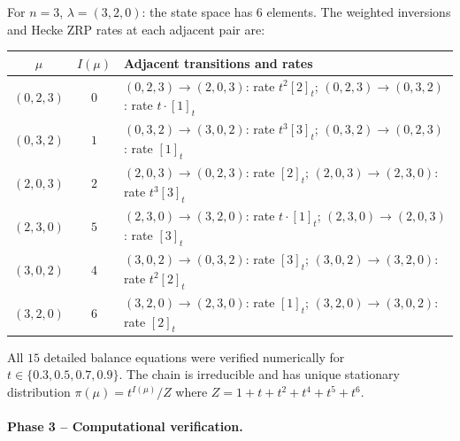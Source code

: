 \begin{remark}
\label{rem:p3-small}
For $n = 3$, $\lambda = (3,2,0)$: the state space has $6$ elements.
The weighted inversions and Hecke ZRP rates at each adjacent pair are:

\begin{center}
\begin{tabular}{c|c|l}
$\mu$ & $I(\mu)$ & Adjacent transitions and rates \\
\hline
$(0,2,3)$ & $0$ & $(0,2,3) \to (2,0,3)$: rate $t^2 [2]_t$; \quad
                   $(0,2,3) \to (0,3,2)$: rate $t \cdot [1]_t$ \\
$(0,3,2)$ & $1$ & $(0,3,2) \to (3,0,2)$: rate $t^3 [3]_t$; \quad
                   $(0,3,2) \to (0,2,3)$: rate $[1]_t$ \\
$(2,0,3)$ & $2$ & $(2,0,3) \to (0,2,3)$: rate $[2]_t$; \quad
                   $(2,0,3) \to (2,3,0)$: rate $t^3 [3]_t$ \\
$(2,3,0)$ & $5$ & $(2,3,0) \to (3,2,0)$: rate $t \cdot [1]_t$; \quad
                   $(2,3,0) \to (2,0,3)$: rate $[3]_t$ \\
$(3,0,2)$ & $4$ & $(3,0,2) \to (0,3,2)$: rate $[3]_t$; \quad
                   $(3,0,2) \to (3,2,0)$: rate $t^2 [2]_t$ \\
$(3,2,0)$ & $6$ & $(3,2,0) \to (2,3,0)$: rate $[1]_t$; \quad
                   $(3,2,0) \to (3,0,2)$: rate $[2]_t$
\end{tabular}
\end{center}

All $15$ detailed balance equations were verified numerically for
$t \in \{0.3, 0.5, 0.7, 0.9\}$. The chain is irreducible and has
unique stationary distribution $\pi(\mu) = t^{I(\mu)} / Z$ where
$Z = 1 + t + t^2 + t^4 + t^5 + t^6$.
\end{remark}

\paragraph{Phase 3 -- Computational verification.}

